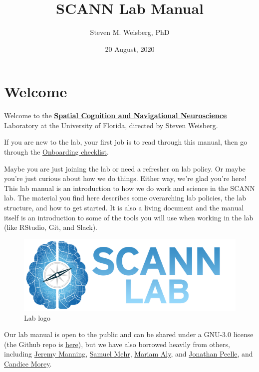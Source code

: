 \documentclass[
  12pt,
]{book}
\title{SCANN Lab Manual}
\author{Steven M. Weisberg, PhD}
\date{20 August, 2020}
\begin{document}
\maketitle

{
\hypersetup{linkcolor=}
\setcounter{tocdepth}{1}
\tableofcontents
}
\hypertarget{welcome}{%
\chapter{Welcome}\label{welcome}}

Welcome to the \href{https://scannlab.psych.ufl.edu}{\textbf{Spatial Cognition and Navigational Neuroscience}} Laboratory at the University of Florida, directed by Steven Weisberg.

If you are new to the lab, your first job is to read through this manual, then go through the \href{onboarding}{Onboarding checklist}.

Maybe you are just joining the lab or need a refresher on lab policy. Or maybe you're just curious about how we do things. Either way, we're glad you're here! This lab manual is an introduction to how we do work and science in the SCANN lab. The material you find here describes some overarching lab policies, the lab structure, and how to get started. It is also a living document and the manual itself is an introduction to some of the tools you will use when working in the lab (like RStudio, Git, and Slack).

\begin{figure}
\centering
\includegraphics{./SCANN_Lab_Logo_NoOutline_With_Text.png}
\caption{Lab logo}
\end{figure}

Our lab manual is open to the public and can be shared under a GNU-3.0 license (the Github repo is \href{https://github.com/scann-lab/lab_manual}{here}), but we have also borrowed heavily from others, including \href{https://github.com/ContextLab/lab-manual}{Jeremy Manning}, \href{https://handbook-public.themusiclab.org/welcome}{Samuel Mehr}, \href{https://github.com/alylab/labmanual}{Mariam Aly}, and \href{https://github.com/jpeelle/peellelab_manual/}{Jonathan Peelle}, and \href{https://ccmorey.github.io/labHandbook/}{Candice Morey}.
\end{document}
